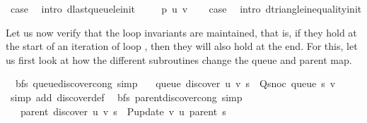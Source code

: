 \begin{isabellebody}
\ {\isacharquery}{\kern0pt}case\ \isamarkupfalse%
\ {\isacharparenleft}{\kern0pt}intro\ d{\isacharunderscore}{\kern0pt}last{\isacharunderscore}{\kern0pt}queue{\isacharunderscore}{\kern0pt}le{\isacharunderscore}{\kern0pt}init{\isacharparenright}{\kern0pt}\isanewline
{}\isamarkupfalse%
\isanewline
\ \ \isamarkupfalse%
\ {\isacharparenleft}{\kern0pt}{}{}\ p\ u\ v{\isacharparenright}{\kern0pt}\isanewline
\ \ \isamarkupfalse%
\ {\isacharquery}{\kern0pt}case\ \isamarkupfalse%
\ {\isacharparenleft}{\kern0pt}intro\ d{\isacharunderscore}{\kern0pt}triangle{\isacharunderscore}{\kern0pt}inequality{\isacharunderscore}{\kern0pt}init{\isacharparenright}{\kern0pt}\isanewline
{}\isamarkupfalse%
%
\endisatagproof
{\isafoldproof}%
%
\isadelimproof
%
\endisadelimproof
%
\begin{isamarkuptext}%
Let us now verify that the loop invariants are maintained, that is, if they hold at the start of an
iteration of loop , then they will also hold at the end. For this, let us first look
at how the different subroutines change the queue and parent map.%
\end{isamarkuptext}\isamarkuptrue%
\isamarkupfalse%
\ {\isacharparenleft}{\kern0pt}\ bfs{\isacharparenright}{\kern0pt}\ queue{\isacharunderscore}{\kern0pt}discover{\isacharunderscore}{\kern0pt}cong\ {\isacharbrackleft}{\kern0pt}simp{\isacharbrackright}{\kern0pt}{\isacharcolon}{\kern0pt}\isanewline
\ \ \ {\isachardoublequoteopen}queue\ {\isacharparenleft}{\kern0pt}discover\ u\ v\ s{\isacharparenright}{\kern0pt}\ {\isacharequal}{\kern0pt}\ Q{\isacharunderscore}{\kern0pt}snoc\ {\isacharparenleft}{\kern0pt}queue\ s{\isacharparenright}{\kern0pt}\ v{\isachardoublequoteclose}\isanewline
%
\isadelimproof
\ \ %
\endisadelimproof
%
\isatagproof
{}\isamarkupfalse%
\ {\isacharparenleft}{\kern0pt}simp\ add{\isacharcolon}{\kern0pt}\ discover{\isacharunderscore}{\kern0pt}def{\isacharparenright}{\kern0pt}%
\endisatagproof
{\isafoldproof}%
%
\isadelimproof
\isanewline
%
\endisadelimproof
\isanewline
{}\isamarkupfalse%
\ {\isacharparenleft}{\kern0pt}\ bfs{\isacharparenright}{\kern0pt}\ parent{\isacharunderscore}{\kern0pt}discover{\isacharunderscore}{\kern0pt}cong\ {\isacharbrackleft}{\kern0pt}simp{\isacharbrackright}{\kern0pt}{\isacharcolon}{\kern0pt}\isanewline
\ \ \ {\isachardoublequoteopen}parent\ {\isacharparenleft}{\kern0pt}discover\ u\ v\ s{\isacharparenright}{\kern0pt}\ {\isacharequal}{\kern0pt}\ P{\isacharunderscore}{\kern0pt}update\ v\ u\ {\isacharparenleft}{\kern0pt}parent\ s{\isacharparenright}{\kern0pt}{\isachardoublequoteclose}\isanewline

\end{isabellebody}
